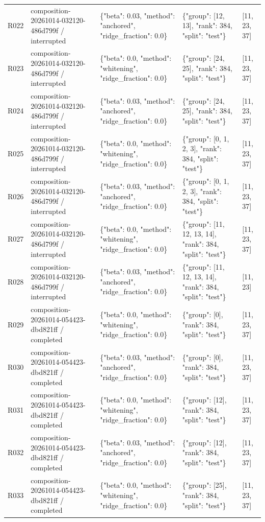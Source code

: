 \documentclass[10pt]{article}
\begin{document}
{\begin{longtable}{p{}p{}p{}p{}p{}}
R022 & composition-20261014-032120-486d799f / interrupted & \{"beta": 0.03, "method": "anchored", "ridge\_fraction": 0.0\} & \{"group": [12, 13], "rank": 384, "split": "test"\} & [11, 23, 37] \\
R023 & composition-20261014-032120-486d799f / interrupted & \{"beta": 0.0, "method": "whitening", "ridge\_fraction": 0.0\} & \{"group": [24, 25], "rank": 384, "split": "test"\} & [11, 23, 37] \\
R024 & composition-20261014-032120-486d799f / interrupted & \{"beta": 0.03, "method": "anchored", "ridge\_fraction": 0.0\} & \{"group": [24, 25], "rank": 384, "split": "test"\} & [11, 23, 37] \\
R025 & composition-20261014-032120-486d799f / interrupted & \{"beta": 0.0, "method": "whitening", "ridge\_fraction": 0.0\} & \{"group": [0, 1, 2, 3], "rank": 384, "split": "test"\} & [11, 23, 37] \\
R026 & composition-20261014-032120-486d799f / interrupted & \{"beta": 0.03, "method": "anchored", "ridge\_fraction": 0.0\} & \{"group": [0, 1, 2, 3], "rank": 384, "split": "test"\} & [11, 23, 37] \\
R027 & composition-20261014-032120-486d799f / interrupted & \{"beta": 0.0, "method": "whitening", "ridge\_fraction": 0.0\} & \{"group": [11, 12, 13, 14], "rank": 384, "split": "test"\} & [11, 23, 37] \\
R028 & composition-20261014-032120-486d799f / interrupted & \{"beta": 0.03, "method": "anchored", "ridge\_fraction": 0.0\} & \{"group": [11, 12, 13, 14], "rank": 384, "split": "test"\} & [11, 23] \\
R029 & composition-20261014-054423-dbd821ff / completed & \{"beta": 0.0, "method": "whitening", "ridge\_fraction": 0.0\} & \{"group": [0], "rank": 384, "split": "test"\} & [11, 23, 37] \\
R030 & composition-20261014-054423-dbd821ff / completed & \{"beta": 0.03, "method": "anchored", "ridge\_fraction": 0.0\} & \{"group": [0], "rank": 384, "split": "test"\} & [11, 23, 37] \\
R031 & composition-20261014-054423-dbd821ff / completed & \{"beta": 0.0, "method": "whitening", "ridge\_fraction": 0.0\} & \{"group": [12], "rank": 384, "split": "test"\} & [11, 23, 37] \\
R032 & composition-20261014-054423-dbd821ff / completed & \{"beta": 0.03, "method": "anchored", "ridge\_fraction": 0.0\} & \{"group": [12], "rank": 384, "split": "test"\} & [11, 23, 37] \\
R033 & composition-20261014-054423-dbd821ff / completed & \{"beta": 0.0, "method": "whitening", "ridge\_fraction": 0.0\} & \{"group": [25], "rank": 384, "split": "test"\} & [11, 23, 37] \\

\end{longtable}}
\end{document}
